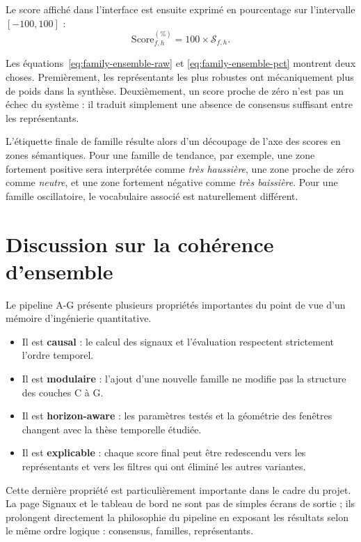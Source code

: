 Le score affiché dans l'interface est ensuite exprimé en pourcentage sur
l'intervalle \([-100,100]\) :
\begin{equation}
\mathrm{Score}_{f,h}^{(\%)} = 100\times \mathcal{S}_{f,h}.
\label{eq:family-ensemble-pct}
\end{equation}

Les équations~\ref{eq:family-ensemble-raw} et
\ref{eq:family-ensemble-pct} montrent deux choses. Premièrement, les
représentants les plus robustes ont mécaniquement plus de poids dans la
synthèse. Deuxièmement, un score proche de zéro n'est pas un échec du système :
il traduit simplement une absence de consensus suffisant entre les représentants.

L'étiquette finale de famille résulte alors d'un découpage de l'axe des scores
en zones sémantiques. Pour une famille de tendance, par exemple, une zone
fortement positive sera interprétée comme \emph{très haussière}, une zone proche
de zéro comme \emph{neutre}, et une zone fortement négative comme
\emph{très baissière}. Pour une famille oscillatoire, le vocabulaire associé est
naturellement différent.

\section{Discussion sur la cohérence d'ensemble}
Le pipeline A-G présente plusieurs propriétés importantes du point de vue d'un
mémoire d'ingénierie quantitative.
\begin{itemize}
\item Il est \textbf{causal} : le calcul des signaux et l'évaluation respectent
strictement l'ordre temporel.
\item Il est \textbf{modulaire} : l'ajout d'une nouvelle famille ne modifie pas
la structure des couches C à G.
\item Il est \textbf{horizon-aware} : les paramètres testés et la géométrie des
fenêtres changent avec la thèse temporelle étudiée.
\item Il est \textbf{explicable} : chaque score final peut être redescendu vers
les représentants et vers les filtres qui ont éliminé les autres variantes.
\end{itemize}

Cette dernière propriété est particulièrement importante dans le cadre du projet.
La page Signaux et le tableau de bord ne sont pas de simples écrans de sortie ;
ils prolongent directement la philosophie du pipeline en exposant les résultats
selon le même ordre logique : consensus, familles, représentants.

